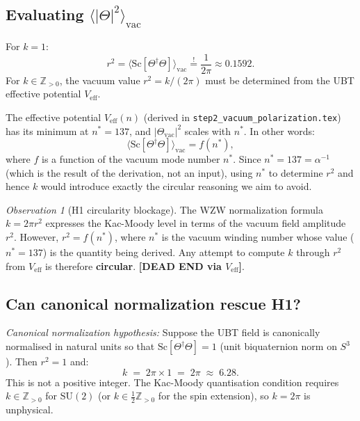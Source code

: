 \documentclass[11pt,a4paper]{article}
\theoremstyle{definition}
\theoremstyle{remark}
\newtheorem{observation}{Observation}
\begin{document}
\subsection{Evaluating \texorpdfstring{$\langle|\Theta|^2\rangle_{\mathrm{vac}}$}{⟨|Θ|²⟩\_vac}}

For $k = 1$:
\begin{equation}
  r^2 = \langle\mathrm{Sc}[\Theta^\dagger\Theta]\rangle_{\mathrm{vac}}
  \stackrel{!}{=} \frac{1}{2\pi} \approx 0.1592.
  \label{eq:r2_for_k1}
\end{equation}
For $k \in \mathbb{Z}_{>0}$, the vacuum value $r^2 = k/(2\pi)$
must be determined from the UBT effective potential $V_{\mathrm{eff}}$.

The effective potential $V_{\mathrm{eff}}(n)$ (derived in
\texttt{step2\_vacuum\_polarization.tex}) has its minimum at
$n^* = 137$, and $|{\Theta_{\mathrm{vac}}}|^2$ scales with $n^*$.
In other words:
\begin{equation}
  \langle\mathrm{Sc}[\Theta^\dagger\Theta]\rangle_{\mathrm{vac}}
  = f(n^*),
  \label{eq:r2_depends_on_nstar}
\end{equation}
where $f$ is a function of the vacuum mode number $n^*$.
Since $n^* = 137 = \alpha^{-1}$ (which is the result of the derivation,
not an input), using $n^*$ to determine $r^2$ and hence $k$ would
introduce exactly the circular reasoning we aim to avoid.

\begin{observation}[H1 circularity blockage]
  \label{obs:H1_circularity}
  The WZW normalization formula $k = 2\pi r^2$ expresses the
  Kac-Moody level in terms of the vacuum field amplitude $r^2$.
  However, $r^2 = f(n^*)$, where $n^*$ is the vacuum winding number
  whose value ($n^* = 137$) is the quantity being derived.
  Any attempt to compute $k$ through $r^2$ from $V_{\mathrm{eff}}$
  is therefore \textbf{circular}.
  \textbf{[DEAD END via $V_{\mathrm{eff}}$]}.
\end{observation}

\subsection{Can canonical normalization rescue H1?}

\noindent\textit{Canonical normalization hypothesis:}
Suppose the UBT field is canonically normalised in natural units so that
$\mathrm{Sc}[\Theta^\dagger\Theta] = 1$ (unit biquaternion norm on $S^3$).
Then $r^2 = 1$ and:
\begin{equation}
  k \;=\; 2\pi \times 1 \;=\; 2\pi \;\approx\; 6.28.
  \label{eq:k_canonical}
\end{equation}
This is not a positive integer.
The Kac-Moody quantisation condition requires $k \in \mathbb{Z}_{>0}$
for $\mathrm{SU}(2)$ (or $k \in \tfrac{1}{2}\mathbb{Z}_{>0}$ for the spin
extension), so $k = 2\pi$ is unphysical.
\end{document}
